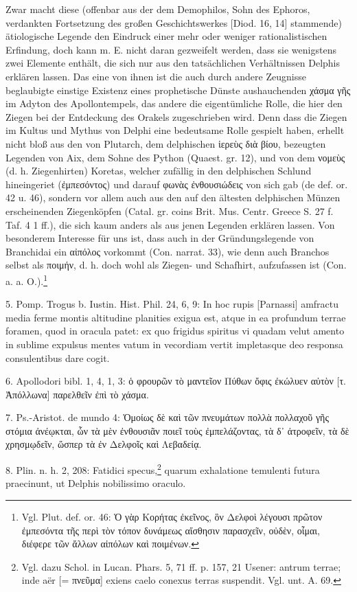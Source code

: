 \documentclass[a4paper, 11pt, oneside]{article}
\begin{document}
Zwar macht diese (offenbar aus der dem Demophilos, Sohn des Ephoros, verdankten Fortsetzung des großen Geschichtswerkes [Diod. 16, 14] stammende) ätiologische Legende den Eindruck einer mehr oder weniger rationalistischen Erfindung, doch kann m. E. nicht daran gezweifelt werden, dass sie wenigstens zwei Elemente enthält, die sich nur aus den tatsächlichen Verhältnissen Delphis erklären lassen. Das eine von ihnen ist die auch durch andere Zeugnisse beglaubigte einstige Existenz eines prophetische Dünste aushauchenden χάσμα γῆς im Adyton des Apollontempels, das andere die eigentümliche Rolle, die hier den Ziegen bei der Entdeckung des Orakels zugeschrieben wird. Denn dass die Ziegen im Kultus und Mythus von Delphi eine bedeutsame Rolle gespielt haben, erhellt nicht bloß aus den von Plutarch, dem delphischen ἱερεὺς διὰ βίου, bezeugten Legenden von Aix, dem Sohne des Python (Quaest. gr. 12), und von dem νομεὺς (d. h. Ziegenhirten) Koretas, welcher zufällig in den delphischen Schlund hineingeriet (ἐμπεσόντος) und darauf φωνὰς ἐνθουσιώδεις von sich gab (de def. or. 42 u. 46), sondern vor allem auch aus den auf den ältesten delphischen Münzen erscheinenden Ziegenköpfen (Catal. gr. coins Brit. Mus. Centr. Greece S. 27 f. Taf. 4 1 ff.), die sich kaum anders als aus jenen Legenden erklären lassen. Von besonderem Interesse für uns ist, dass auch in der Gründungslegende von Branchidai ein αἰπόλος vorkommt (Con. narrat. 33), wie denn auch Branchos selbst als ποιμήν, d. h. doch wohl als Ziegen- und Schafhirt, aufzufassen ist (Con. a. a. O.).\footnote{Vgl. Plut. def. or. 46: Ὁ γὰρ Κορήτας ἐκεῖνος, ὃν Δελφοὶ λέγουσι πρῶτον ἐμπεσόντα τῆς περὶ τὸν τόπον δυνάμεως αἴσθησιν παρασχεῖν, οὐδὲν, οἶμαι, διέφερε τῶν ἄλλων αἰπόλων καὶ ποιμένων.}

5. Pomp. Trogus b. Iustin. Hist. Phil. 24, 6, 9: In hoc rupis [Parnassi] amfractu media ferme montis altitudine planities exigua est, atque in ea profundum terrae foramen, quod in oracula patet: ex quo frigidus spiritus vi quadam velut amento in sublime expulsus mentes vatum in vecordiam vertit impletasque deo responsa consulentibus dare cogit.

6. Apollodori bibl. 1, 4, 1, 3: ὁ φρουρῶν τὸ μαντεῖον Πύθων ὄφις ἐκώλυεν αὐτὸν [τ. Ἀπόλλωνα] παρελθεῖν ἐπὶ τὸ χάσμα.

7. Ps.-Aristot. de mundo 4: Ὁμοίως δὲ καὶ τῶν πνευμάτων πολλὰ πολλαχοῦ γῆς στόμια ἀνέῳκται, ὧν τὰ μὲν ἐνθουσιᾶν ποιεῖ τοὺς ἐμπελάζοντας, τὰ δ᾽ ἀτροφεῖν, τὰ δὲ χρησμῳδεῖν, ὥσπερ τὰ ἐν Δελφοῖς καὶ Λεβαδείᾳ.

8. Plin. n. h. 2, 208: Fatidici specus,\footnote{Vgl. dazu Schol. in Lucan. Phars. 5, 71 ff. p. 157, 21 Usener: antrum terrae; inde aër [= πνεῦμα] exiens caelo conexus terras suspendit. Vgl. unt. A. 69.} quarum exhalatione temulenti futura praecinunt, ut Delphis nobilissimo oraculo.
\end{document}
